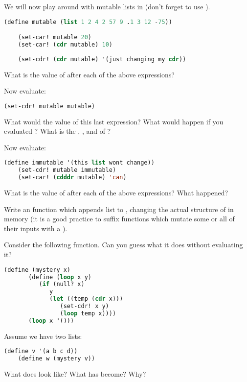 \documentclass{../../../tp}
\begin{document}
\begin{instruction}
	We will now play around with mutable lists in \scheme (don't forget to use ).

	\begin{lstlisting}[language=lisp]
	(define mutable (list 1 2 4 2 57 9 .1 3 12 -75))

	(set-car! mutable 20)
	(set-car! (cdr mutable) 10)
	
	(set-cdr! (cdr mutable) '(just changing my cdr))
	 \end{lstlisting}
	 
	What is the value of  after each of the above expressions?
	
	Now evaluate:
	\begin{lstlisting}[language=lisp]
	(set-cdr! mutable mutable)
	 \end{lstlisting}

	What would the value of this last expression? What would happen if you evaluated ? What is the , ,  and  of ?
	
	Now evaluate:
	\begin{lstlisting}[language=lisp]	
	(define immutable '(this list wont change))
	(set-cdr! mutable immutable)
	(set-car! (cdddr mutable) 'can)
	 \end{lstlisting}
	 
	 What is the value of  after each of the above expressions? What happened? 	
\end{instruction}

\begin{instruction}
	Write an  function which appends list  to , changing the actual structure of  in memory (it is a good \scheme practice to suffix functions which mutate some or all of their inputs with a \schemecode{!}).  
\end{instruction}

\begin{instruction}
	
	Consider the following  function. Can you guess what it does without evaluating it? 
	
	\begin{lstlisting}[language=lisp]
	(define (mystery x)
	   (define (loop x y)
	      (if (null? x)
	         y
	         (let ((temp (cdr x)))
	            (set-cdr! x y)
	            (loop temp x))))
	   (loop x '()))
	\end{lstlisting}
	
	Assume we have two lists:
	
	\begin{lstlisting}[language=lisp]
	(define v '(a b c d))
	(define w (mystery v))
	\end{lstlisting}
	
	What does  look like? What has  become? Why?
	
\end{instruction}
\end{document}
